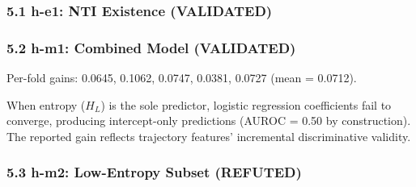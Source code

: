 
\subsubsection{5.1 h-e1: NTI Existence (VALIDATED)}

\begin{table}[htbp]
\centering
{}
\end{table}

\subsubsection{5.2 h-m1: Combined Model (VALIDATED)}

\begin{table}[htbp]
\centering
{}
\end{table}

Per-fold gains: 0.0645, 0.1062, 0.0747, 0.0381, 0.0727 (mean = 0.0712).

When entropy ($H_L$) is the sole predictor, logistic regression coefficients fail to converge, producing intercept-only predictions (AUROC = 0.50 by construction). The reported gain reflects trajectory features' incremental discriminative validity.

\subsubsection{5.3 h-m2: Low-Entropy Subset (REFUTED)}

